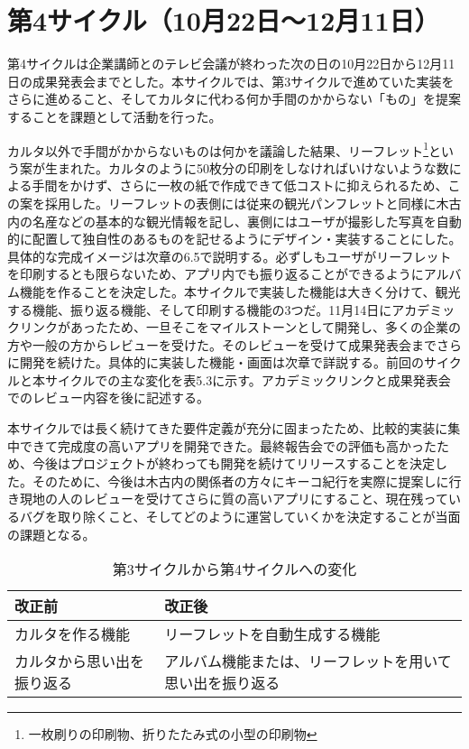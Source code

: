 \section{第4サイクル（10月22日〜12月11日）}
第4サイクルは企業講師とのテレビ会議が終わった次の日の10月22日から12月11日の成果発表会までとした。本サイクルでは、第3サイクルで進めていた実装をさらに進めること、そしてカルタに代わる何か手間のかからない「もの」を提案することを課題として活動を行った。
\par カルタ以外で手間がかからないものは何かを議論した結果、リーフレット\footnote{一枚刷りの印刷物、折りたたみ式の小型の印刷物}という案が生まれた。カルタのように50枚分の印刷をしなければいけないような数による手間をかけず、さらに一枚の紙で作成できて低コストに抑えられるため、この案を採用した。リーフレットの表側には従来の観光パンフレットと同様に木古内の名産などの基本的な観光情報を記し、裏側にはユーザが撮影した写真を自動的に配置して独自性のあるものを記せるようにデザイン・実装することにした。具体的な完成イメージは次章の6.5で説明する。必ずしもユーザがリーフレットを印刷するとも限らないため、アプリ内でも振り返ることができるようにアルバム機能を作ることを決定した。本サイクルで実装した機能は大きく分けて、観光する機能、振り返る機能、そして印刷する機能の3つだ。11月14日にアカデミックリンクがあったため、一旦そこをマイルストーンとして開発し、多くの企業の方や一般の方からレビューを受けた。そのレビューを受けて成果発表会までさらに開発を続けた。具体的に実装した機能・画面は次章で詳説する。前回のサイクルと本サイクルでの主な変化を表5.3に示す。アカデミックリンクと成果発表会でのレビュー内容を後に記述する。
\par 本サイクルでは長く続けてきた要件定義が充分に固まったため、比較的実装に集中できて完成度の高いアプリを開発できた。最終報告会での評価も高かったため、今後はプロジェクトが終わっても開発を続けてリリースすることを決定した。そのために、今後は木古内の関係者の方々にキーコ紀行を実際に提案しに行き現地の人のレビューを受けてさらに質の高いアプリにすること、現在残っているバグを取り除くこと、そしてどのように運営していくかを決定することが当面の課題となる。

\begin{table}[htb]
\centering
\addtocounter{table}{+0}
\caption{第3サイクルから第4サイクルへの変化}
  \begin{tabular}{|l|l|} \hline
    改正前&改正後  \\ \hline 
    カルタを作る機能 & \parbox{20zw}{リーフレットを自動生成する機能} \\  \hline
    カルタから思い出を振り返る &\parbox{20zw}{アルバム機能または、リーフレットを用いて思い出を振り返る}\rule[-6mm]{0mm}{14mm}\\ \hline
  \end{tabular} 
\end{table}

